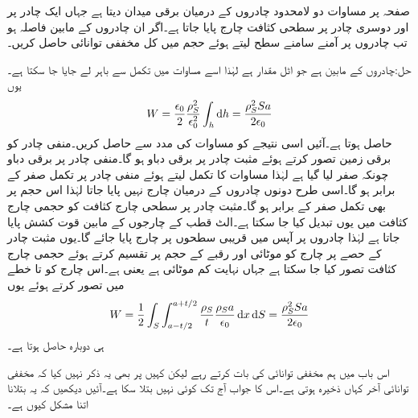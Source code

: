 صفحہ  پر مساوات  دو لامحدود چادروں کے درمیان برقی میدان دیتا ہے جہاں ایک چادر پر  اور دوسری چادر پر  سطحی کثافت چارج پایا جاتا ہے۔اگر ان چادروں کے مابین فاصلہ  ہو تب چادروں پر آمنے سامنے  سطح لیتے ہوئے حجم    میں کل مخففی توانائی حاصل کریں۔

حل:چادروں کے مابین  ہے جو اٹل مقدار ہے  لہٰذا اسے مساوات  میں تکمل سے باہر لے جایا جا سکتا ہے۔یوں
\begin{align}\label{مساوات_توانائی_مخففی_توانائی_ذخیرہ_الف}
W=\frac{\epsilon_0}{2}\frac{\rho_S^2}{\epsilon_0^2} \int_h \dif h =\frac{\rho_S^2 S a}{2 \epsilon_0}
\end{align}
حاصل ہوتا ہے۔آئیں اسی نتیجے کو مساوات  کی مدد سے حاصل کریں۔منفی چادر کو برقی زمین تصور کرتے ہوئے مثبت چادر پر  برقی دباو ہو گا۔منفی چادر پر برقی دباو چونکہ صفر لیا گیا ہے لہٰذا مساوات  کا تکمل لیتے ہوئے منفی چادر پر تکمل صفر کے برابر ہو گا۔اسی طرح دونوں چادروں کے درمیان چارج نہیں پایا جاتا لہٰذا اس حجم  پر بھی تکمل صفر کے برابر ہو گا۔مثبت چادر پر سطحی چارج کثافت کو حجمی چارج کثافت میں یوں تبدیل کیا جا سکتا ہے۔الٹ قطب کے چارجوں کے مابین قوت کشش پایا جاتا ہے لہٰذا چادروں پر آپس میں قریبی سطحوں پر چارج پایا جائے گا۔یوں مثبت چادر  کے  حصے پر چارج  کو  موٹائی اور  رقبے کے حجم  پر تقسیم کرتے ہوئے  حجمی چارج کثافت تصور کیا جا سکتا ہے جہاں  نہایت کم موٹائی ہے یعنی  ہے۔اس چارج کو  تا  خطے میں تصور کرتے ہوئے یوں
\begin{align}\label{مساوات_توانائی_مخففی_توانائی_ذخیرہ_ب}
W=\frac{1}{2}\int_S \int_{a-t/2}^{a+t/2} \frac{\rho_S}{t} \frac{\rho_S a}{\epsilon_0} \dif x \dif S=\frac{\rho_S^2 S a}{2 \epsilon_0}
\end{align}
ہی دوبارہ حاصل ہوتا ہے۔

اس باب میں ہم مخففی توانائی کی بات کرتے رہے لیکن کہیں پر بھی یہ ذکر نہیں کیا کہ مخففی توانائی آخر کہاں  ذخیرہ ہوتی ہے۔اس کا جواب آج تک کوئی نہیں بتلا سکا ہے۔آئیں دیکھیں کہ یہ بتلانا اتنا مشکل کیوں ہے۔

